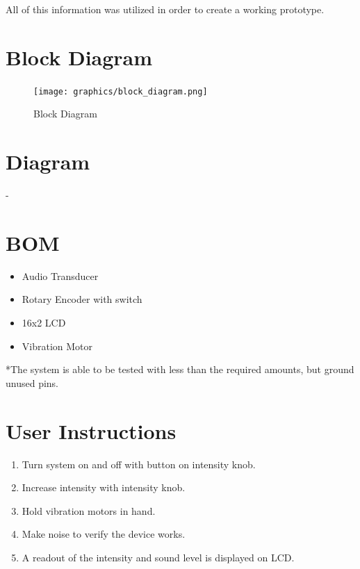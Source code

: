 \documentclass{article}
\begin{document}
All of this information was utilized in order to create a working prototype.


\section{Block Diagram}
    \begin{figure}[h!]
    \begin{center}
        \texttt{[image: graphics/block\_diagram.png]}
    \end{center}
    \caption{Block Diagram}
    \label{fig:Block}
    \end{figure}

\section{Diagram}
-
\section{BOM}
    \begin{itemize}
        \item Audio Transducer              \tab [x5]
        \item Rotary Encoder with switch    \tab [x1]
        \item 16x2 LCD                      \tab [x1] 
        \item Vibration Motor               \tab [x2] 
    \end{itemize}
    *The system is able to be tested with less than the required amounts, but ground unused pins.

\section{User Instructions}
\begin{enumerate}
    \item Turn system on and off with button on intensity knob.
    \item Increase intensity with intensity knob.
    \item Hold vibration motors in hand.
    \item Make noise to verify the device works.
    \item A readout of the intensity and sound level is displayed on LCD.
\end{enumerate}

\newpage
\end{document}
